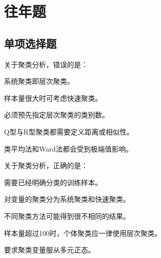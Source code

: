
\label{chapter:3}

\section{往年题}

\par\addvspace{6pt}\noindent\begin{minipage}{\linewidth}

\subsection{单项选择题}


关于聚类分析，错误的是：


\begin{choices}

\item 系统聚类即层次聚类。

\item 样本量很大时可考虑快速聚类。

\item 必须预先指定层次聚类的类别数。

\item Q型与R型聚类都需要定义距离或相似性。

\item 类平均法和Ward法都会受到极端值影响。

\end{choices}

\end{minipage}\par\vspace{4pt}

\par\addvspace{6pt}\noindent\begin{minipage}{\linewidth}


关于聚类分析，正确的是：


\begin{choices}

\item 需要已经明确分类的训练样本。

\item 对变量的聚类分为系统聚类和快速聚类。

\item 不同聚类方法可能得到很不相同的结果。

\item 样本量超过100时，个体聚类应一律使用层次聚类。

\item 要求聚类变量服从多元正态。

\end{choices}

\end{minipage}\par\vspace{4pt}

